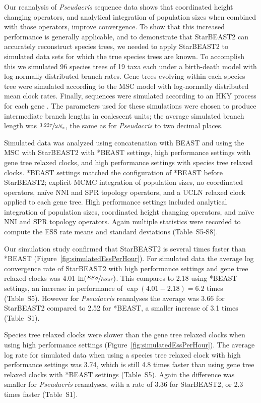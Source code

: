 \documentclass[nogrid]{MBE}%
\begin{document}
Our reanalysis of \textit{Pseudacris} sequence data shows that coordinated height changing operators,
and analytical integration of population sizes when combined with those operators,
improve convergence. To show that this increased performance is generally
applicable, and to demonstrate that StarBEAST2 can accurately reconstruct
species trees, we needed to apply StarBEAST2 to simulated data sets for
which the true species trees are known. To accomplish this we simulated 96 species
trees of 19 taxa each under a birth-death model with log-normally distributed
branch rates. Gene trees evolving within each species tree were simulated
according to the MSC model with log-normally distributed mean clock rates.
Finally, sequences were simulated according to an HKY process for each gene
\citep{Hasegawa1985, Goldman1993}. The parameters used for these simulations
were chosen to produce intermediate branch lengths in coalescent units; the
average simulated branch length was $\nicefrac{3.22\tau}{2N_e}$, the same as for
\textit{Pseudacris} to two decimal places.

Simulated data was analyzed using concatenation with BEAST and using the MSC with
StarBEAST2 with *BEAST settings,
high performance settings with gene tree relaxed clocks, and high performance settings with
species tree relaxed clocks. *BEAST settings matched the configuration of *BEAST
before StarBEAST2; explicit MCMC integration of population sizes, no
coordinated operators, na\"ive NNI and SPR topology operators, and a UCLN
relaxed clock applied to each gene tree. High performance settings included analytical
integration of population sizes, coordinated height changing operators, and
na\"ive NNI and SPR topology operators. Again multiple statistics were recorded
to compute the ESS rate means and standard deviations (Table~S5-S8).

Our simulation study confirmed that StarBEAST2 is several times faster than
*BEAST (Figure~\ref{fig:simulatedEssPerHour}). For simulated data the average
log convergence rate of StarBEAST2 with high performance settings and gene tree
relaxed clocks was 4.01 $\ln(\nicefrac{ESS}{hour})$. This compares to
2.18 using *BEAST settings, an increase in performance of
$\exp(4.01 - 2.18) = 6.2$ times (Table~S5). However
for \textit{Pseudacris} reanalyses the average was 3.66 for StarBEAST2 compared
to 2.52 for *BEAST, a smaller increase of 3.1 times (Table~S1).

Species tree relaxed clocks were slower than the gene tree relaxed clocks when
using high performance settings (Figure~\ref{fig:simulatedEssPerHour}). The
average log rate for simulated data when using a species tree relaxed clock with
high performance settings was 3.74, which is still 4.8 times faster than
using gene tree relaxed clocks with *BEAST settings (Table~S5). Again the
difference was smaller for \textit{Pseudacris} reanalyses, with a rate of 3.36
for StarBEAST2, or 2.3 times faster (Table~S1).
\end{document}
